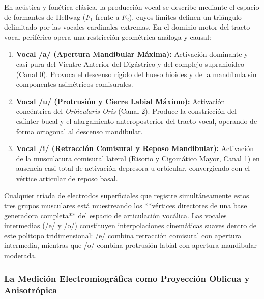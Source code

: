 \documentclass[11pt,a4paper]{article}
\begin{document}
En acústica y fonética clásica, la producción vocal se describe mediante el espacio de formantes de Hellwag ($F_1$ frente a $F_2$), cuyos límites definen un triángulo delimitado por las vocales cardinales extremas. En el dominio motor del tracto vocal periférico opera una restricción geométrica análoga y causal:
\begin{enumerate}
    \item \textbf{Vocal /a/ (Apertura Mandibular Máxima):} Activación dominante y casi pura del Vientre Anterior del Digástrico y del complejo suprahioideo (Canal 0). Provoca el descenso rígido del hueso hioides y de la mandíbula sin componentes asimétricos comisurales.
    \item \textbf{Vocal /u/ (Protrusión y Cierre Labial Máximo):} Activación concéntrica del \textit{Orbicularis Oris} (Canal 2). Produce la constricción del esfínter bucal y el alargamiento anteroposterior del tracto vocal, operando de forma ortogonal al descenso mandibular.
    \item \textbf{Vocal /i/ (Retracción Comisural y Reposo Mandibular):} Activación de la musculatura comisural lateral (Risorio y Cigomático Mayor, Canal 1) en ausencia casi total de activación depresora u orbicular, convergiendo con el vértice articular de reposo basal.
\end{enumerate}

Cualquier tríada de electrodos superficiales que registre simultáneamente estos tres grupos musculares está muestreando los **vértices directores de una base generadora completa** del espacio de articulación vocálica. Las vocales intermedias (/e/ y /o/) constituyen interpolaciones cinemáticas suaves dentro de este politopo tridimensional: /e/ combina retracción comisural con apertura intermedia, mientras que /o/ combina protrusión labial con apertura mandibular moderada.

\subsubsection{La Medición Electromiográfica como Proyección Oblicua y Anisotrópica}
\label{subsubsec:medicion_como_proyeccion_oblicua}
\end{document}
